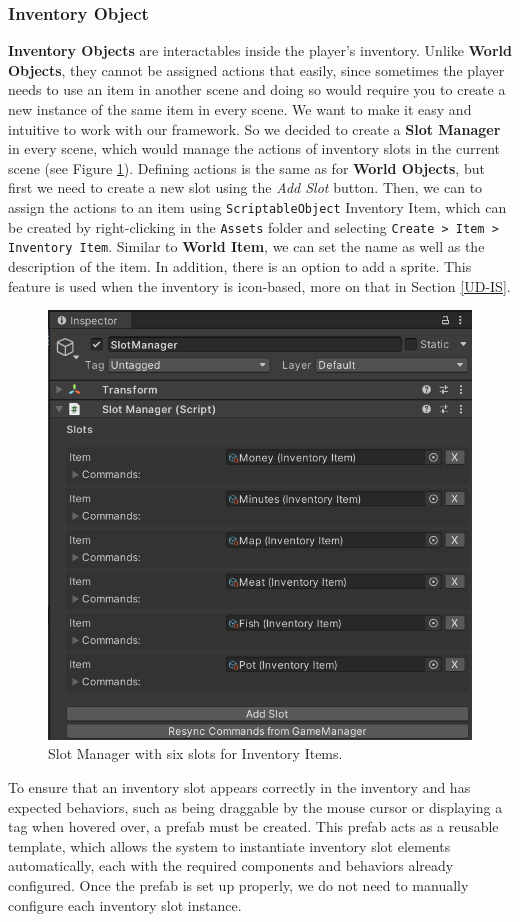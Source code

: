 \subsubsection{Inventory Object}
\label{Manual:IO}
\textbf{Inventory Objects} are interactables inside the player's inventory. Unlike \textbf{World Objects}, they cannot be assigned actions that easily, since sometimes the player needs to use an item in another scene and doing so would require you to create a new instance of the same item in every scene. We want to make it easy and intuitive to work with our framework. So we decided to create a \textbf{Slot Manager} in every scene, which would manage the actions of inventory slots in the current scene (see Figure \ref{fig:Manual-SM}). Defining actions is the same as for \textbf{World Objects}, but first we need to create a new slot using the \textit{Add Slot} button. Then, we can to assign the actions to an item using \verb|ScriptableObject| Inventory Item, which can be created by right-clicking in the \verb|Assets| folder and selecting \verb|Create > Item > Inventory Item|. Similar to \textbf{World Item},  we can set the name as well as the description of the item. In addition, there is an option to add a sprite. This feature is used when the inventory is icon-based, more on that in Section \ref{UD-IS}.

\begin{figure}[H]
\centering
\includegraphics[width=.7\linewidth]{img/image_2025-07-05_133040354.png}
\caption{Slot Manager with six slots for Inventory Items.}
\label{fig:Manual-SM}
\end{figure}

To ensure that an inventory slot appears correctly in the inventory and has expected behaviors, such as being draggable by the mouse cursor or displaying a tag when hovered over, a prefab must be created. This prefab acts as a reusable template, which allows the system to instantiate inventory slot elements automatically, each with the required components and behaviors already configured. Once the prefab is set up properly, we do not need to manually configure each inventory slot instance.

